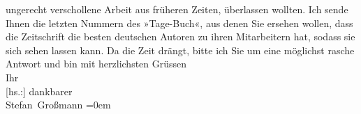 \begin{ledgroupsized}[t]{13cm}
               ungerecht verschollene Arbeit aus früheren Zeiten, überlassen wollten. Ich sende
               Ihnen die letzten Nummern des »Tage-Buch«, aus
               denen Sie ersehen wollen, dass die Zeitschrift die besten deutschen Autoren zu ihren
               Mitarbeitern hat, sodass sie sich sehen lassen kann.\pend
           \pstart
           {\pb}Da die Zeit drängt, bitte ich Sie um eine
               möglichst rasche Antwort und bin\pend
           \pstart
           mit herzlichsten Grüssen{\\[\baselineskip]}Ihr{\\[\baselineskip]}{[}hs.:{]} dankbarer{\\[\baselineskip]}\spacefill\mbox{Stefan Großmann}\pend
           \leftskip=0em{}
         
         \endnumbering{}\end{ledgroupsized}  \newcommand{\dateiname}{L02378}\newcommand{\titel}{Stefan Großmann an Arthur Schnitzler, 26. 4. 1922}\newcommand{\editorInnen}{ Martin Anton Müller und Gerd-Hermann Susen}
      